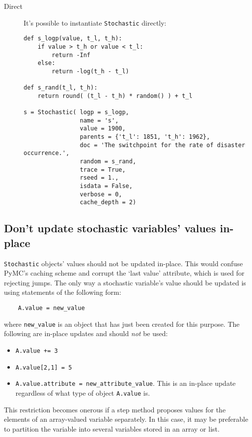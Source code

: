 \begin{description}
    \item[Direct] It's possible to instantiate \texttt{Stochastic} directly:
\begin{verbatim}
def s_logp(value, t_l, t_h):
    if value > t_h or value < t_l:
        return -Inf
    else:
        return -log(t_h - t_l) 

def s_rand(t_l, t_h):
    return round( (t_l - t_h) * random() ) + t_l

s = Stochastic( logp = s_logp, 
                name = 's', 
                value = 1900,
                parents = {'t_l': 1851, 't_h': 1962},
                doc = 'The switchpoint for the rate of disaster occurrence.',
                random = s_rand, 
                trace = True, 
                rseed = 1., 
                isdata = False,
                verbose = 0,
                cache_depth = 2)
\end{verbatim}
\end{description}

\subsection{Don't update stochastic variables' values in-place}\label{sub:warning}

\texttt{Stochastic} objects' values should not be updated in-place. This would confuse PyMC's caching scheme and corrupt the `last value' attribute, which is used for rejecting jumps. The only way a stochastic variable's value should be updated is using statements of the following form:
\begin{verbatim}
    A.value = new_value
\end{verbatim}
where \texttt{new_value} is an object that has just been created for this purpose. The following are in-place updates and should \emph{not} be used:
\begin{itemize}
    \item \texttt{A.value += 3}
    \item \texttt{A.value[2,1] = 5}
    \item \texttt{A.value.attribute = new_attribute_value}. This is an in-place update regardless of what type of object \texttt{A.value} is.
\end{itemize}

This restriction becomes onerous if a step method proposes values for the elements of an array-valued variable separately. In this case, it may be preferable to partition the variable into several variables stored in an array or list.

